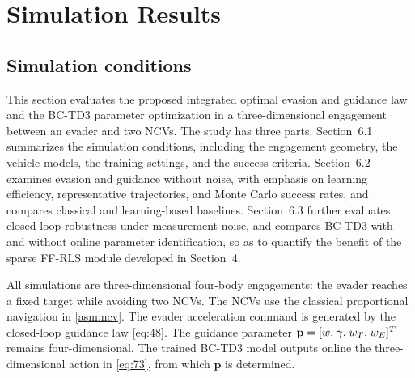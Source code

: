 %
\section{Simulation Results}
\subsection{Simulation conditions}
This section evaluates the proposed integrated optimal evasion and guidance law and the BC-TD3 parameter optimization in a three-dimensional engagement between an evader and two NCVs. The study has three parts. Section~6.1 summarizes the simulation conditions, including the engagement geometry, the vehicle models, the training settings, and the success criteria. Section~6.2 examines evasion and guidance without noise, with emphasis on learning efficiency, representative trajectories, and Monte Carlo success rates, and compares classical and learning-based baselines. Section~6.3 further evaluates closed-loop robustness under measurement noise, and compares BC-TD3 with and without online parameter identification, so as to quantify the benefit of the sparse FF-RLS module developed in Section~4.

All simulations are three-dimensional four-body engagements: the evader reaches a fixed target while avoiding two NCVs. The NCVs use the classical proportional navigation in \cref{asm:ncv}. The evader acceleration command is generated by the closed-loop guidance law \eqref{eq:48}. The guidance parameter ${\mathbf{p}} = {[w,{\kern 1pt} \gamma ,{\kern 1pt} {w_T},{\kern 1pt} {w_E}]^T}$ remains four-dimensional. The trained BC-TD3 model outputs online the three-dimensional action in \eqref{eq:73}, from which ${\mathbf{p}}$ is determined.

